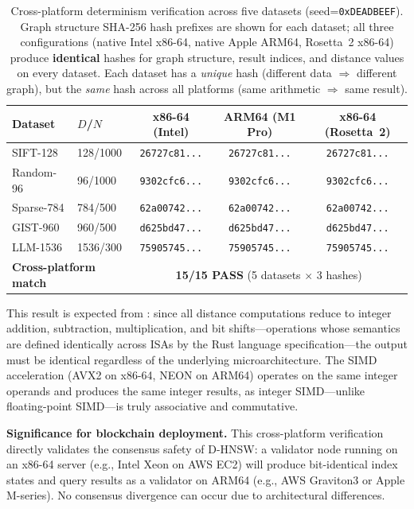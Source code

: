 \documentclass[10pt,journal]{IEEEtran}
\newcommand{\dhnsw}{\textsc{D-HNSW}}
\begin{document}
\begin{table}[t]
  \centering
  \caption{Cross-platform determinism verification across five datasets (seed=\texttt{0xDEADBEEF}). Graph structure SHA-256 hash prefixes are shown for each dataset; all three configurations (native Intel x86-64, native Apple ARM64, Rosetta~2 x86-64) produce \textbf{identical} hashes for graph structure, result indices, and distance values on every dataset. Each dataset has a \emph{unique} hash (different data $\Rightarrow$ different graph), but the \emph{same} hash across all platforms (same arithmetic $\Rightarrow$ same result).}
  \label{tab:crossplatform}
  \footnotesize
  \begin{tabular}{llccc}
    \toprule
    \textbf{Dataset} & \textbf{$D$/$N$} & \textbf{x86-64 (Intel)} & \textbf{ARM64 (M1 Pro)} & \textbf{x86-64 (Rosetta~2)} \\
    \midrule
    SIFT-128    & 128/1000 & \texttt{26727c81...} & \texttt{26727c81...} & \texttt{26727c81...} \\
    Random-96   & 96/1000  & \texttt{9302cfc6...} & \texttt{9302cfc6...} & \texttt{9302cfc6...} \\
    Sparse-784  & 784/500  & \texttt{62a00742...} & \texttt{62a00742...} & \texttt{62a00742...} \\
    GIST-960    & 960/500  & \texttt{d625bd47...} & \texttt{d625bd47...} & \texttt{d625bd47...} \\
    LLM-1536    & 1536/300 & \texttt{75905745...} & \texttt{75905745...} & \texttt{75905745...} \\
    \midrule
    \multicolumn{2}{l}{\textbf{Cross-platform match}} & \multicolumn{3}{c}{\textbf{15/15 PASS} (5 datasets $\times$ 3 hashes)} \\
    \bottomrule
  \end{tabular}
\end{table}

This result is expected from : since all distance computations reduce to integer addition, subtraction, multiplication, and bit shifts---operations whose semantics are defined identically across ISAs by the Rust language specification---the output must be identical regardless of the underlying microarchitecture. The SIMD acceleration (AVX2 on x86-64, NEON on ARM64) operates on the same integer operands and produces the same integer results, as integer SIMD---unlike floating-point SIMD---is truly associative and commutative.

\textbf{Significance for blockchain deployment.} This cross-platform verification directly validates the consensus safety of \dhnsw{}: a validator node running on an x86-64 server (e.g., Intel Xeon on AWS EC2) will produce bit-identical index states and query results as a validator on ARM64 (e.g., AWS Graviton3 or Apple M-series). No consensus divergence can occur due to architectural differences.
\end{document}

